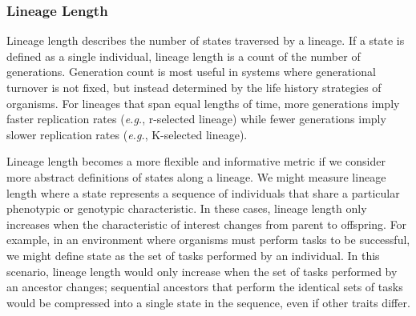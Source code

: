 \documentclass[letterpaper]{article}
\begin{document}
\subsubsection{Lineage Length}
Lineage length describes the number of states traversed by a lineage. If a state is defined as a single individual, %
lineage length is a count of the number of generations.
Generation count is most useful in systems where generational turnover is not fixed, %
but instead determined by the life history strategies of organisms.
For lineages that span equal lengths of time, more generations imply faster replication rates (\textit{e.g.}, r-selected lineage) while fewer generations imply slower replication rates (\textit{e.g.}, K-selected lineage). 

Lineage length becomes %
a more flexible and informative metric if we consider more abstract definitions of %
states along a lineage. 
We might measure lineage length where a state represents a %
sequence of individuals that share a particular phenotypic or genotypic characteristic.
In these cases, lineage length only increases when the characteristic of interest changes from parent to offspring. For example, in an environment where organisms must perform tasks to be successful, we might define state as the set of tasks performed by an individual. %
In this scenario, lineage length would only increase when the set of tasks performed by an ancestor changes; sequential ancestors that perform the identical sets of tasks would be compressed into a single state in the sequence, even if other traits differ. 
\end{document}
